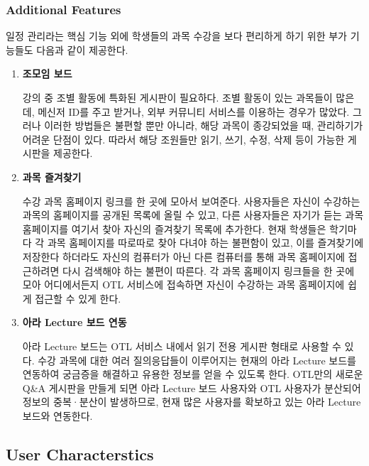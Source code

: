 \documentclass[a4paper,titlepage]{article}
\begin{document}
\subsubsection{Additional Features}
일정 관리라는 핵심 기능 외에 학생들의 과목 수강을 보다 편리하게 하기 위한 부가 기능들도 다음과 같이 제공한다.
\begin{enumerate}
	\item\textbf{조모임 보드}

	강의 중 조별 활동에 특화된 게시판이 필요하다.
	조별 활동이 있는 과목들이 많은데, 메신저 ID를 주고 받거나, 외부 커뮤니티 서비스를 이용하는 경우가 많았다.
	그러나 이러한 방법들은 불편할 뿐만 아니라, 해당 과목이 종강되었을 때, 관리하기가 어려운 단점이 있다. 
	따라서 해당 조원들만 읽기, 쓰기, 수정, 삭제 등이 가능한 게시판을 제공한다. 

	\item\textbf{과목 즐겨찾기}

	수강 과목 홈페이지 링크를 한 곳에 모아서 보여준다.
	사용자들은 자신이 수강하는 과목의 홈페이지를 공개된 목록에 올릴 수 있고, 다른 사용자들은 자기가 듣는 과목 홈페이지를 여기서 찾아 자신의 즐겨찾기 목록에 추가한다.
	현재 학생들은 학기마다 각 과목 홈페이지를 따로따로 찾아 다녀야 하는 불편함이 있고, 이를 즐겨찾기에 저장한다 하더라도 자신의 컴퓨터가 아닌 다른 컴퓨터를 통해 과목 홈페이지에 접근하려면 다시 검색해야 하는 불편이 따른다.
	각 과목 홈페이지 링크들을 한 곳에 모아 어디에서든지 OTL 서비스에 접속하면 자신이 수강하는 과목 홈페이지에 쉽게 접근할 수 있게 한다. 

	\item\textbf{아라 Lecture 보드 연동}

	아라 Lecture 보드는 OTL 서비스 내에서 읽기 전용 게시판 형태로 사용할 수 있다.
	수강 과목에 대한 여러 질의응답들이 이루어지는 현재의 아라 Lecture 보드를 연동하여 궁금증을 해결하고 유용한 정보를 얻을 수 있도록 한다.
	OTL만의 새로운 Q\&A 게시판을 만들게 되면 아라 Lecture 보드 사용자와 OTL 사용자가 분산되어 정보의 중복·분산이 발생하므로, 현재 많은 사용자를 확보하고 있는 아라 Lecture 보드와 연동한다.

\end{enumerate}

\subsection{User Characterstics}
\end{document}
